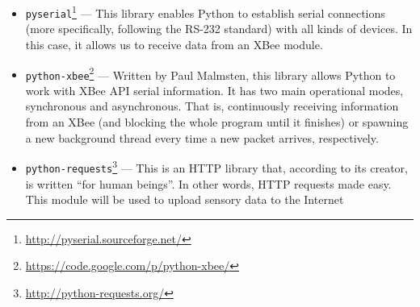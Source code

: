 \begin{itemize}
    \item \texttt{pyserial}\footnote{\url{http://pyserial.sourceforge.net/}} --- This library enables Python to establish serial connections (more specifically, following the RS-232 standard) with all kinds of devices. In this case, it allows us to receive data from an XBee\textregistered{} module.
    \item \texttt{python-xbee}\footnote{\url{https://code.google.com/p/python-xbee/}} --- Written by Paul Malmsten, this library allows Python to work with XBee API serial information. It has two main operational modes, synchronous and asynchronous. That is, continuously receiving information from an XBee\textregistered{} (and blocking the whole program until it finishes) or spawning a new background thread every time a new packet arrives, respectively.
    \item \texttt{python-requests}\footnote{\url{http://python-requests.org/}} --- This is an HTTP library that, according to its creator, is written ``for human beings''. In other words, HTTP requests made easy. This module will be used to upload sensory data to the Internet
\end{itemize}
